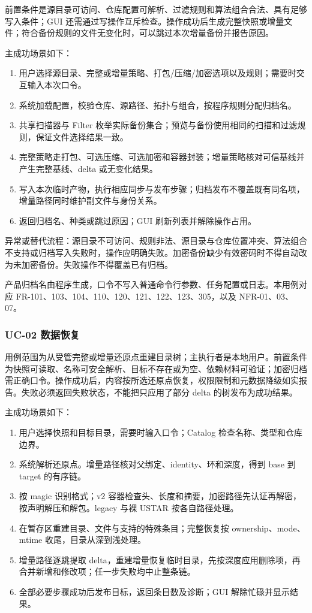 前置条件是源目录可访问、仓库配置可解析、过滤规则和算法组合合法、具有足够写入条件；GUI 还需通过写操作互斥检查。操作成功后生成完整快照或增量文件；符合备份规则的文件无变化时，可以跳过本次增量备份并报告原因。

主成功场景如下：
\begin{enumerate}
\item 用户选择源目录、完整或增量策略、打包/压缩/加密选项以及规则；需要时交互输入本次口令。
\item 系统加载配置，校验仓库、源路径、拓扑与组合，按程序规则分配归档名。
\item 共享扫描器与 Filter 枚举实际备份集合；预览与备份使用相同的扫描和过滤规则，保证文件选择结果一致。
\item 完整策略走打包、可选压缩、可选加密和容器封装；增量策略核对可信基线并产生完整基线、delta 或无变化结果。
\item 写入本次临时产物，执行相应同步与发布步骤；归档发布不覆盖既有同名项，增量路径同时维护副文件与身份关系。
\item 返回归档名、种类或跳过原因；GUI 刷新列表并解除操作占用。
\end{enumerate}

异常或替代流程：源目录不可访问、规则非法、源目录与仓库位置冲突、算法组合不支持或归档写入失败时，操作应明确失败。加密备份缺少有效密码时不得自动改为未加密备份。失败操作不得覆盖已有归档。

产品归档名由程序生成，口令不写入普通命令行参数、任务配置或日志。本用例对应 FR-101、103、104、110、120、121、122、123、305，以及 NFR-01、03、07。

\subsubsection{UC-02 数据恢复}
用例范围为从受管完整或增量还原点重建目录树；主执行者是本地用户。前置条件为快照可读取、名称可安全解析、目标不存在或为空、依赖材料可验证；加密归档需正确口令。操作成功后，内容按所选还原点恢复，权限限制和元数据降级如实报告。失败必须返回失败状态，不能把只应用了部分 delta 的树发布为成功结果。

主成功场景如下：
\begin{enumerate}
\item 用户选择快照和目标目录，需要时输入口令；Catalog 检查名称、类型和仓库边界。
\item 系统解析还原点。增量路径核对父绑定、identity、环和深度，得到 base 到 target 的有序链。
\item 按 magic 识别格式；v2 容器检查头、长度和摘要，加密路径先认证再解密，按声明解压和解包。legacy 与裸 USTAR 按各自路径处理。
\item 在暂存区重建目录、文件与支持的特殊条目；完整恢复按 ownership、mode、mtime 收尾，目录从深到浅处理。
\item 增量路径逐跳提取 delta，重建增量恢复临时目录，先按深度应用删除项，再合并新增和修改项；任一步失败均中止整条链。
\item 全部必要步骤成功后发布目标，返回条目数及诊断；GUI 解除忙碌并显示结果。
\end{enumerate}

